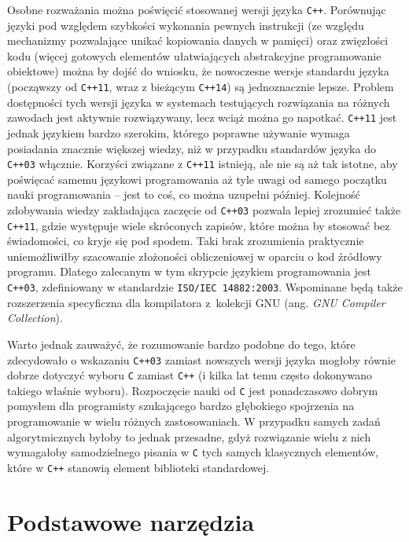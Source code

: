 Osobne rozważania można poświęcić stosowanej wersji języka \texttt{C++}.
Porównując języki pod względem szybkości wykonania pewnych instrukcji
(ze względu mechanizmy pozwalające unikać kopiowania danych w pamięci)
oraz zwięzłości kodu (więcej gotowych elementów ułatwiających abstrakcyjne
programowanie obiektowe) można by dojść do wniosku, że nowoczesne wersje
standardu języka (począwszy od \texttt{C++11}, wraz z bieżącym \texttt{C++14})
są jednoznacznie lepsze.
Problem dostępności tych wersji języka w systemach testujących rozwiązania
na różnych zawodach jest aktywnie rozwiązywany, lecz wciąż można go napotkać.
\texttt{C++11} jest jednak językiem bardzo szerokim, którego poprawne używanie
wymaga posiadania znacznie większej wiedzy, niż w przypadku standardów języka
do \texttt{C++03} włącznie. Korzyści związane z \texttt{C++11} istnieją, ale
nie są aż tak istotne, aby poświęcać samemu językowi programowania aż tyle uwagi
od samego początku nauki programowania -- jest to coś, co można uzupełni
później. Kolejność zdobywania wiedzy zakładająca zaczęcie od \texttt{C++03}
pozwala lepiej zrozumieć także \texttt{C++11}, gdzie występuje wiele skróconych
zapisów, które można by stosować bez świadomości, co kryje się pod spodem. Taki
brak zrozumienia praktycznie uniemożliwiłby szacowanie złożoności obliczeniowej
w oparciu o kod źródłowy programu. Dlatego zalecanym w tym skrypcie językiem
programowania jest \texttt{C++03}, zdefiniowany w standardzie
\texttt{ISO/IEC 14882:2003}. Wspominane będą także rozszerzenia specyficzna dla
kompilatora z~kolekcji GNU (ang. \emph{GNU Compiler Collection}).

Warto jednak zauważyć, że rozumowanie bardzo podobne do tego, które zdecydowało
o wskazaniu \texttt{C++03} zamiast nowszych wersji języka mogłoby równie dobrze
dotyczyć wyboru \texttt{C} zamiast \texttt{C++} (i kilka lat temu często
dokonywano takiego właśnie wyboru). Rozpoczęcie nauki od \texttt{C} jest
ponadczasowo dobrym pomysłem dla programisty szukającego bardzo głębokiego
spojrzenia na programowanie w wielu różnych zastosowaniach. W przypadku samych
zadań algorytmicznych byłoby to jednak przesadne, gdyż rozwiązanie wielu z nich
wymagałoby samodzielnego pisania w \texttt{C} tych samych klasycznych elementów,
które w \texttt{C++} stanowią element biblioteki standardowej.


\section{Podstawowe narzędzia}

